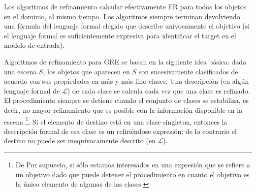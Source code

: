
Los algoritmos de refinamiento
calcular efectivamente ER para todos los objetos en el dominio, al mismo
tiempo. Los algoritmos siempre terminan devolviendo una f\'ormula del
lenguaje formal elegido que describe un\'{i}vocamente el objetivo (si el
lenguaje formal es suficientemente expresiva para identificar el target en el
modelo de entrada).


Algoritmos de refinamiento para GRE se basan en la siguiente idea b\'asica:
dada una escena $S$, los objetos que aparecen en $S$ son sucesivamente
clasificados de acuerdo con sus propiedades en m\'as y m\'as fino
clases. Una descripci\'on (en alg\'un lenguaje formal de $\mathcal{L}$) de cada
clase se calcula cada vez que una clase es refinado. El procedimiento siempre
se detiene cuando el conjunto de clases se estabiliza, es decir, no mayor refinamiento
que es posible con la informaci\'on disponible en la escena \footnote{De
   Por supuesto, si s\'olo estamos interesados en una expresi\'on que se refiere a un
   objetivo dado que puede detener el procedimiento en cuanto el objetivo es la
   \'unico elemento de algunas de las clases.}. Si el elemento de destino est\'a en
una clase singleton, entonces la descripci\'on formal de esa clase es un
refiri\'endose expresi\'on; de lo contrario el destino no puede ser inequ\'{i}vocamente
descrito (en $\mathcal{L}$).

